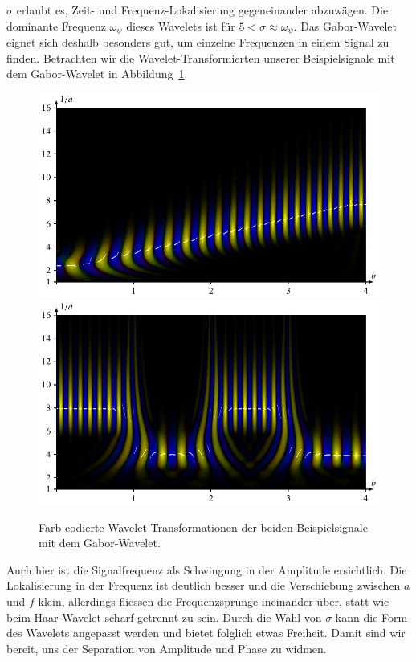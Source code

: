 $\sigma$ erlaubt es, Zeit- und Frequenz-Lokalisierung gegeneinander abzuwägen.
Die dominante Frequenz $\omega_\psi$ dieses Wavelets ist für $5 < \sigma \approx \omega_\psi$.
Das Gabor-Wavelet eignet sich deshalb besonders gut, um einzelne Frequenzen in einem Signal zu finden.
Betrachten wir die Wavelet-Transformierten unserer Beispielsignale mit dem Gabor-Wavelet in Abbildung~\ref{complex:gabor-ex}.
\begin{figure}
	\centering
	\includegraphics{papers/complex/images/chirp_gabor.pdf}
	\includegraphics{papers/complex/images/square_gabor.pdf}
	\caption{Farb-codierte Wavelet-Transformationen  der beiden Beispielsignale mit dem Gabor-Wavelet.}
	\label{complex:gabor-ex}
\end{figure}

Auch hier ist die Signalfrequenz als Schwingung in der Amplitude ersichtlich. 
Die Lokalisierung in der Frequenz ist deutlich besser und die Verschiebung zwischen $a$ und $f$ klein, allerdings fliessen die Frequenzsprünge ineinander über, statt wie beim Haar-Wavelet scharf getrennt zu sein.
Durch die Wahl von $\sigma$ kann die Form des Wavelets angepasst werden und bietet folglich etwas Freiheit.
Damit sind wir bereit, uns der Separation von Amplitude und Phase zu widmen.